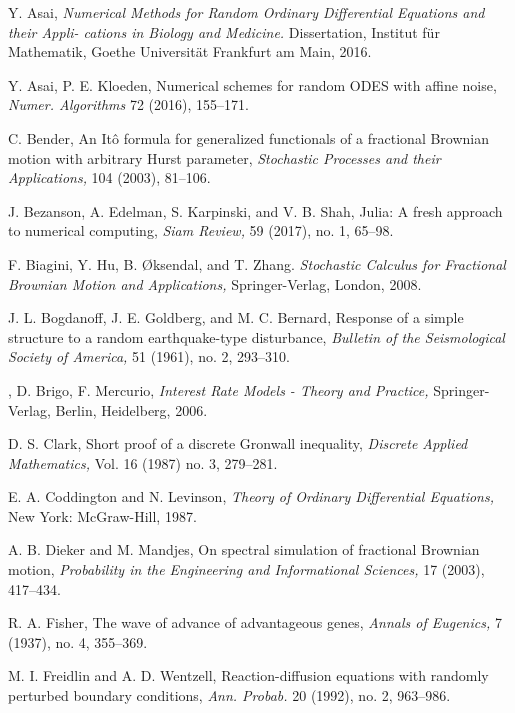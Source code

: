 \documentclass[reqno,12pt]{amsart}
\theoremstyle{plain} %
\theoremstyle{definition} %
\begin{document}
\begin{thebibliography}{25}
     Y. Asai, \emph{Numerical Methods for Random Ordinary Differential Equations and their Appli-
    cations in Biology and Medicine.} Dissertation, Institut f\"ur Mathematik, Goethe Universit\"at Frankfurt am Main, 2016.

     Y. Asai, P. E. Kloeden, Numerical schemes for random ODES with affine noise, \emph{Numer. Algorithms} 72 (2016), 155--171.

     C. Bender, An It\^o formula for generalized functionals of a fractional Brownian motion with arbitrary Hurst parameter, \emph{Stochastic Processes and their Applications,} 104 (2003), 81--106.

     J. Bezanson, A. Edelman, S. Karpinski, and V. B. Shah, Julia: A fresh approach to numerical computing, \emph{Siam Review,} 59 (2017), no. 1, 65--98.

     F. Biagini, Y. Hu, B. {\O}ksendal, and T. Zhang. \emph{Stochastic Calculus for Fractional Brownian Motion and Applications,} Springer-Verlag, London, 2008.

     J. L. Bogdanoff, J. E. Goldberg, and M. C. Bernard, Response of a simple structure to a random earthquake-type disturbance, \emph{Bulletin of the Seismological Society of America,} 51 (1961), no. 2, 293--310.

    , D. Brigo, F. Mercurio, \emph{Interest Rate Models - Theory and Practice,} Springer-Verlag, Berlin, Heidelberg, 2006.

     D. S. Clark, Short proof of a discrete Gronwall inequality, \emph{Discrete Applied Mathematics,} Vol. 16 (1987) no. 3, 279--281.

     E. A. Coddington and N. Levinson, \emph{Theory of Ordinary Differential Equations,} New York: McGraw-Hill, 1987.

     A. B. Dieker and M. Mandjes, On spectral simulation of fractional Brownian motion, \emph{Probability in the Engineering and Informational Sciences,} 17 (2003), 417--434.

     R. A. Fisher, The wave of advance of advantageous genes, \emph{Annals of Eugenics,} 7 (1937), no. 4, 355--369.

     M. I. Freidlin and A. D. Wentzell, Reaction-diffusion equations with randomly perturbed boundary conditions, \emph{Ann. Probab.} 20 (1992), no. 2, 963--986.


\end{thebibliography}
\end{document}
